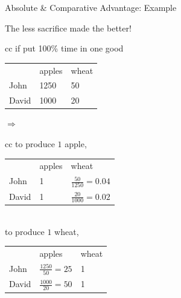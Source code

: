\documentclass[11pt,aspectratio=43,usenames,dvipsnames]{beamer}
\theoremstyle{definition}
\begin{document}
\begin{frame}{Absolute \& Comparative Advantage: Example}
\label{slide:Absolute____Comparative_Advantage__Example}

    \begin{center}
        The less sacrifice made the better!
    \end{center}

    \begin{tabular}{cc}
        if put 100\% time in one good
        \\
        \begin{tabular}{lll}
                & apples
                & wheat
            \\
            John
                & 1250
                & 50
            \\
            David
                & 1000
                & 20
            \\
        \end{tabular}
    \end{tabular}
    $ \Longrightarrow $
    \begin{tabular}{cc}
        to produce $ 1$ apple,
        \\
        \begin{tabular}{lll}
                & apples
                & wheat
            \\
            John
                & 1
                & $\frac{50}{1250} = 0.04$
            \\
            David
                & 1
                & $ \frac{20}{1000} = 0.02$ \checkmark
            \\
        \end{tabular}
        \\
        to produce $ 1$ wheat,
        \\
        \begin{tabular}{lll}
                & apples
                & wheat
            \\
            John
                & $ \frac{1250}{50} = 25 $
                & 1
            \\
            David
                & $ \frac{1000}{20} = 50$ \checkmark
                & 1
            \\
        \end{tabular}
    \end{tabular}

    \vspace{0.5em}


\end{frame}
\end{document}
